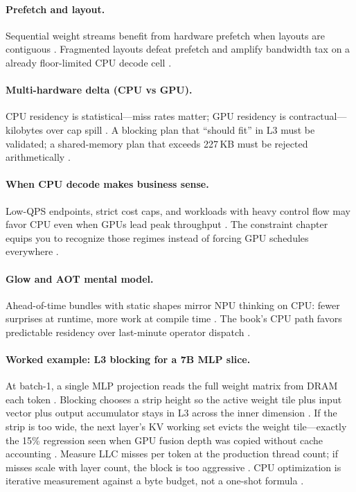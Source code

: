 \paragraph{Prefetch and layout.}
Sequential weight streams benefit from hardware prefetch when layouts are contiguous \citep{dlbook}.
Fragmented layouts defeat prefetch and amplify bandwidth tax on a already floor-limited CPU decode cell \citep{patel2025llminference,kwon2023vllm}.

\paragraph{Multi-hardware delta (CPU vs GPU).}
CPU residency is statistical---miss rates matter; GPU residency is contractual---kilobytes over cap spill \citep{nvidia2022hopper,dlbook}.
A blocking plan that ``should fit'' in L3 must be validated; a shared-memory plan that exceeds 227\,KB must be rejected arithmetically \citep{memoryfloor2026,yirage2026}.

\paragraph{When CPU decode makes business sense.}
Low-QPS endpoints, strict cost caps, and workloads with heavy control flow may favor CPU even when GPUs lead peak throughput \citep{patel2025llminference,kwon2023vllm}.
The constraint chapter equips you to recognize those regimes instead of forcing GPU schedules everywhere \citep{rotem2018glow,dlbook}.

\paragraph{Glow and AOT mental model.}
Ahead-of-time bundles with static shapes mirror NPU thinking on CPU: fewer surprises at runtime, more work at compile time \citep{rotem2018glow,chen2020compilerbasedhardw}.
The book's CPU path favors predictable residency over last-minute operator dispatch \citep{yirage2026}.

\paragraph{Worked example: L3 blocking for a 7B MLP slice.}
At batch-1, a single MLP projection reads the full weight matrix from DRAM each token \citep{kwon2023vllm}.
Blocking chooses a strip height so the active weight tile plus input vector plus output accumulator stays in L3 across the inner dimension \citep{dlbook,rotem2018glow}.
If the strip is too wide, the next layer's KV working set evicts the weight tile---exactly the 15\% regression seen when GPU fusion depth was copied without cache accounting \citep{patel2025llminference}.
Measure LLC misses per token at the production thread count; if misses scale with layer count, the block is too aggressive \citep{memoryfloor2026}.
CPU optimization is iterative measurement against a byte budget, not a one-shot formula \citep{dlbook}.

